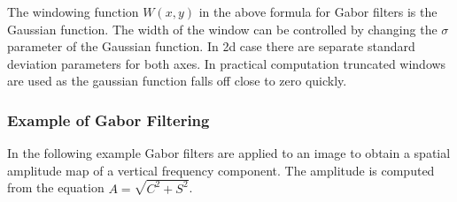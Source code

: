 \documentclass[]{article}
\begin{document}
The windowing function $W(x,y)$ in the above formula for Gabor filters is the
Gaussian function. The width of the window can be controlled by changing the
$\sigma$ parameter of the Gaussian function. In 2d case there are separate
standard deviation parameters for both axes. In practical computation truncated
windows are used as the gaussian function falls off close to zero quickly.

\subsubsection{Example of Gabor Filtering}
\label{example-of-gabor-filtering}
In the following example Gabor filters are applied to an image to obtain a
spatial amplitude map of a vertical frequency component. The amplitude is
computed from the equation $A = \sqrt{C^{2}+S^{2}}$.
\end{document}
